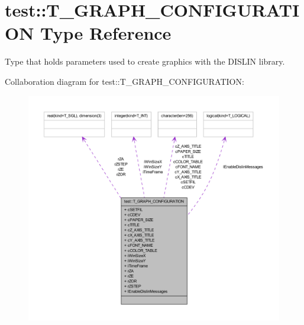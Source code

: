 \hypertarget{typetest_1_1_t___g_r_a_p_h___c_o_n_f_i_g_u_r_a_t_i_o_n}{
\section{test::T\_\-GRAPH\_\-CONFIGURATION Type Reference}
\label{typetest_1_1_t___g_r_a_p_h___c_o_n_f_i_g_u_r_a_t_i_o_n}
}


Type that holds parameters used to create graphics with the DISLIN library.  




Collaboration diagram for test::T\_\-GRAPH\_\-CONFIGURATION:\nopagebreak
\begin{figure}[H]
\begin{center}
\leavevmode
\includegraphics[width=400pt]{typetest_1_1_t___g_r_a_p_h___c_o_n_f_i_g_u_r_a_t_i_o_n__coll__graph}
\end{center}
\end{figure}
